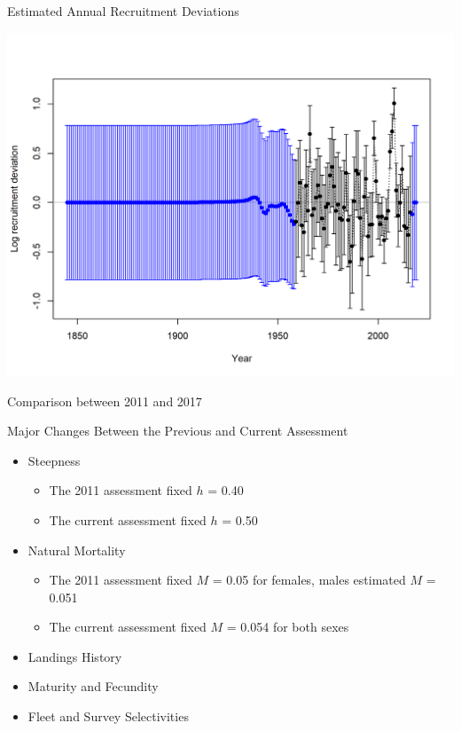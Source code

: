 \documentclass[pdf]{beamer}\usepackage[]{graphicx}\usepackage[]{color}
\begin{document}
\begin{frame}{Estimated Annual Recruitment Deviations}
  \begin{center}
    \includegraphics[scale = 0.50, trim={0cm 0cm 0cm 1.7cm}, clip]{r4ss/recdevs2_withbars.png}
  \end{center}
\end{frame}



\begin{frame}{Comparison between 2011 and 2017}
  \begin{center}
  \end{center}
\end{frame}

\begin{frame}{Major Changes Between the Previous and Current Assessment}
  \begin{itemize}
    \item Steepness 
      \begin{itemize}
        \item The 2011 assessment fixed $h$ = 0.40
        \item The current assessment fixed $h$ = 0.50 
      \end{itemize}
    \item Natural Mortality
      \begin{itemize}
        \item The 2011 assessment fixed $M$ = 0.05 for females, males estimated $M$ = 0.051
        \item The current assessment fixed $M$ = 0.054 for both sexes
      \end{itemize}
    \item Landings History
    \item Maturity and Fecundity
    \item Fleet and Survey Selectivities 
  \end{itemize}
\end{frame}
\end{document}

